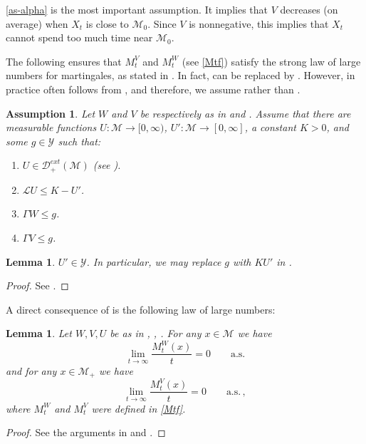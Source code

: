 \documentclass[final]{amsart}
\newtheorem{ass}{Assumption}[]
\newtheorem{lem}[thm]{Lemma}
\numberwithin{thm}{section}
\numberwithin{equation}{section}
\newcommand{\mcM}{\mathcal{M}}
\newcommand{\inv}{\mathcal{M}_+}
\newcommand{\Dme}{\mathcal{D}^{ext}}
\newcommand{\Y}{\mathcal{Y}}
\begin{document}
\ref{as-alpha} is the most important assumption. It implies that $V$ decreases (on average) when $X_t$ is close to $\mcM_0$. Since $V$ is nonnegative, this implies that $X_t$ cannot spend too much time near $\mcM_0$.

The following  ensures that $M_t^V$ and $M_t^W$ (see \eqref{Mtf}) satisfy the strong law of large numbers for martingales, as stated in . In fact,  can be replaced by . However, in practice  often follows from , and therefore, we assume  rather than .


\begin{ass}\label{as-U}
    Let $W$ and $V$ be respectively as in  and . Assume that 
there are measurable functions $U: \mcM \to [0,\infty)$, $U': \mcM \to [0,\infty]$, a constant $K > 0$, and some $g \in \Y$ such that:
   \begin{enumerate}[label=(\roman*)]
       \item \label{5.1} $U \in \Dme_+(\mcM)$ (see ).
       \item \label{5.2} $\mathcal{L}U \leq K - U'$.
       \item \label{5.3} $\Gamma W \leq g$.
       \item \label{5.4} $\Gamma V \leq g$.
   \end{enumerate}
\end{ass} 

\begin{lem}\label{u'-in-y}
    $U' \in \Y$. In particular, we may replace $g$ with $KU'$ in .
\end{lem}
\begin{proof}
    See \cite[Lemma 4.1]{extinction}.
\end{proof}


A direct consequence of  is the following law of large numbers: 
\begin{lem}\label{strong-law}
Let $W,V,U$ be as in , , .
For any $x \in \mcM$ we have 
\begin{equation}
    \lim_{t \to \infty} \frac{M_t^W(x)}{t} = 0 \qquad \textrm{a.s.}
\end{equation}
and for any $x \in \inv$ we have 
\begin{equation}
    \lim_{t \to \infty} \frac{M_t^V(x)}{t} = 0 \qquad \textrm{a.s.} \,,
\end{equation}
where $M^W_t$ and $M^V_t$ were defined in \eqref{Mtf}. 
\end{lem}
\begin{proof}
    See the arguments in \cite[Lemma 2.12]{extinction} and \cite[Corollary 4.2]{extinction}.
\end{proof}
\end{document}
